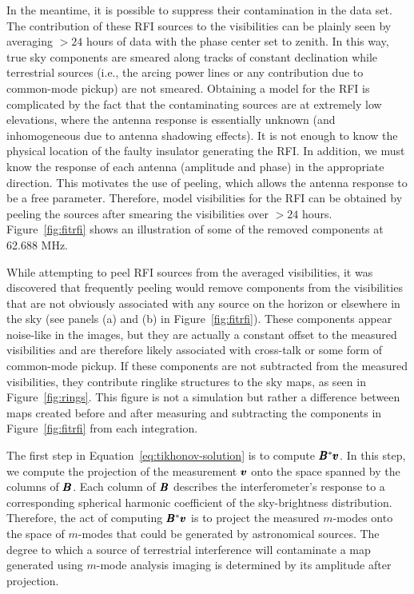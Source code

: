 \begin{bibunit}
In the meantime, it is possible to suppress their contamination in the data set. The contribution of
these RFI sources to the visibilities can be plainly seen by averaging $>24$ hours of data with the
phase center set to zenith. In this way, true sky components are smeared along tracks of constant
declination while terrestrial sources (i.e., the arcing power lines or any contribution due to
common-mode pickup) are not smeared.  Obtaining a model for the RFI is complicated by the fact that
the contaminating sources are at extremely low elevations, where the antenna response is essentially
unknown (and inhomogeneous due to antenna shadowing effects). It is not enough to know the physical
location of the faulty insulator generating the RFI. In addition, we must know the response of each
antenna (amplitude and phase) in the appropriate direction. This motivates the use of peeling, which
allows the antenna response to be a free parameter.  Therefore, model visibilities for the RFI can
be obtained by peeling the sources after smearing the visibilities over $>24$ hours.
Figure~\ref{fig:fitrfi} shows an illustration of some of the removed components at 62.688 MHz.

While attempting to peel RFI sources from the averaged visibilities, it was discovered that
frequently peeling would remove components from the visibilities that are not obviously associated
with any source on the horizon or elsewhere in the sky (see panels (a) and (b) in
Figure~\ref{fig:fitrfi}).  These components appear noise-like in the images, but they are actually a
constant offset to the measured visibilities and are therefore likely associated with cross-talk or
some form of common-mode pickup. If these components are not subtracted from the measured
visibilities, they contribute ringlike structures to the sky maps, as seen in
Figure~\ref{fig:rings}. This figure is not a simulation but rather a difference between maps created
before and after measuring and subtracting the components in Figure~\ref{fig:fitrfi} from each
integration.

The first step in Equation~\ref{eq:tikhonov-solution} is to compute $\pmb B^*\pmb v$. In this step, we
compute the projection of the measurement $\pmb v$ onto the space spanned by the columns of $\pmb B$.
Each column of $\pmb B$ describes the interferometer's response to a corresponding spherical harmonic
coefficient of the sky-brightness distribution. Therefore, the act of computing $\pmb B^*\pmb v$ is to
project the measured $m$-modes onto the space of $m$-modes that could be generated by astronomical
sources. The degree to which a source of terrestrial interference will contaminate a map generated
using $m$-mode analysis imaging is determined by its amplitude after projection.


\end{bibunit}
